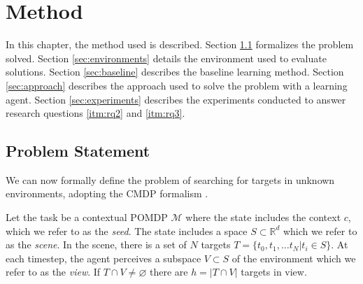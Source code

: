 \chapter{Method}
\label{cha:method}


% 

In this chapter, the method used is described.
Section \ref{sec:problem} formalizes the problem solved.
Section \ref{sec:environments} details the environment used to evaluate solutions.
Section \ref{sec:baseline} describes the baseline learning method.
Section \ref{sec:approach} describes the approach used to solve the problem with a learning agent.
Section \ref{sec:experiments} describes the experiments conducted to answer research questions \ref{itm:rq2} and \ref{itm:rq3}.

\section{Problem Statement}
\label{sec:problem}


We can now formally define the problem of searching for targets in unknown environments,
adopting the CMDP formalism \cite{kirk_survey_2022}.

Let the task be a contextual POMDP \(\mathcal{M}\) where the state includes the context \(c\), which we refer to as the \textit{seed}.
The state includes a space \(S \subset \mathbb{R}^d\) which we refer to as the \textit{scene}.
In the scene, there is a set of \(N\) targets \(T = \{t_0, t_1, \dots t_N | t_i \in S\}\).
At each timestep, the agent perceives a subspace \(V \subset S\) of the environment which we refer to as the \textit{view}.
If \(T \cap V \neq \varnothing\) there are \(h = \left\lvert T \cap V \right\rvert\) targets in view.

